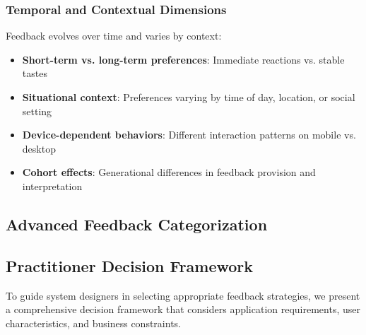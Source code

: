 \subsubsection{Temporal and Contextual Dimensions}

Feedback evolves over time and varies by context:
\begin{itemize}
    \item \textbf{Short-term vs. long-term preferences}: Immediate reactions vs. stable tastes
    \item \textbf{Situational context}: Preferences varying by time of day, location, or social setting
    \item \textbf{Device-dependent behaviors}: Different interaction patterns on mobile vs. desktop
    \item \textbf{Cohort effects}: Generational differences in feedback provision and interpretation
\end{itemize}

\subsection{Advanced Feedback Categorization}

\subsection{Practitioner Decision Framework}

To guide system designers in selecting appropriate feedback strategies, we present a comprehensive decision framework that considers application requirements, user characteristics, and business constraints.

